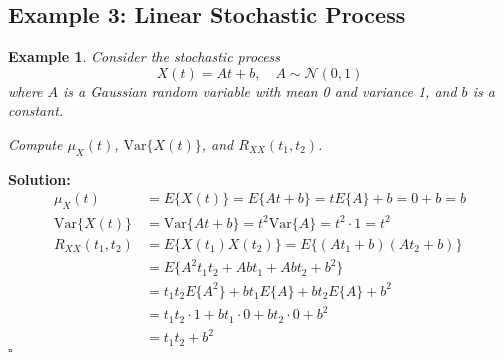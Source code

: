 \documentclass[12pt]{article}
\newtheorem{example}{Example}
\newenvironment{solution}{\noindent\textbf{Solution:}}{\hfill$\square$}
\begin{document}
\subsection{Example 3: Linear Stochastic Process}
\begin{example}
Consider the stochastic process
\[
X(t) = A t + b, \quad A \sim \mathcal{N}(0, 1)
\]
where \( A \) is a Gaussian random variable with mean 0 and variance 1, and \( b \) is a constant.

Compute \( \mu_X(t) \), \( \text{Var}\{X(t)\} \), and \( R_{XX}(t_1, t_2) \).
\end{example}
\begin{solution}
\begin{align*}
\mu_X(t) &= E\{X(t)\} = E\{A t + b\} = t E\{A\} + b = 0 + b = b \\
\text{Var}\{X(t)\} &= \text{Var}\{A t + b\} = t^2 \text{Var}\{A\} = t^2 \cdot 1 = t^2 \\
R_{XX}(t_1, t_2) &= E\{X(t_1) X(t_2)\} = E\{(A t_1 + b)(A t_2 + b)\} \\
&= E\{A^2 t_1 t_2 + A b t_1 + A b t_2 + b^2\} \\
&= t_1 t_2 E\{A^2\} + b t_1 E\{A\} + b t_2 E\{A\} + b^2 \\
&= t_1 t_2 \cdot 1 + b t_1 \cdot 0 + b t_2 \cdot 0 + b^2 \\
&= t_1 t_2 + b^2
\end{align*}
\end{solution}
\end{document}
